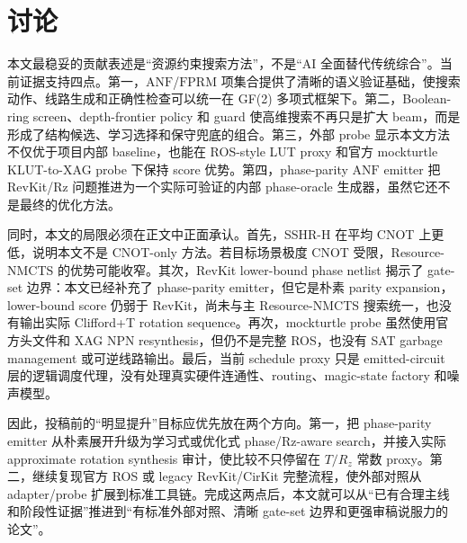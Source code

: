\documentclass[UTF8,fontset=macnew,11pt]{ctexart}
\newcommand{\method}{Resource-NMCTS}
\newcommand{\anf}{\ensuremath{\mathrm{ANF}}}
\newcommand{\fprm}{\ensuremath{\mathrm{FPRM}}}
\begin{document}
\section{讨论}

本文最稳妥的贡献表述是“资源约束搜索方法”，不是“AI 全面替代传统综合”。当前证据支持四点。第一，\anf{}/\fprm{} 项集合提供了清晰的语义验证基础，使搜索动作、线路生成和正确性检查可以统一在 GF(2) 多项式框架下。第二，Boolean-ring screen、depth-frontier policy 和 guard 使高维搜索不再只是扩大 beam，而是形成了结构候选、学习选择和保守兜底的组合。第三，外部 probe 显示本文方法不仅优于项目内部 baseline，也能在 ROS-style LUT proxy 和官方 mockturtle KLUT-to-XAG probe 下保持 score 优势。第四，phase-parity \anf{} emitter 把 RevKit/Rz 问题推进为一个实际可验证的内部 phase-oracle 生成器，虽然它还不是最终的优化方法。

同时，本文的局限必须在正文中正面承认。首先，SSHR-H 在平均 CNOT 上更低，说明本文不是 CNOT-only 方法。若目标场景极度 CNOT 受限，\method{} 的优势可能收窄。其次，RevKit lower-bound phase netlist 揭示了 gate-set 边界：本文已经补充了 phase-parity emitter，但它是朴素 parity expansion，lower-bound score 仍弱于 RevKit，尚未与主 \method{} 搜索统一，也没有输出实际 Clifford+T rotation sequence。再次，mockturtle probe 虽然使用官方头文件和 XAG NPN resynthesis，但仍不是完整 ROS，也没有 SAT garbage management 或可逆线路输出。最后，当前 schedule proxy 只是 emitted-circuit 层的逻辑调度代理，没有处理真实硬件连通性、routing、magic-state factory 和噪声模型。

因此，投稿前的“明显提升”目标应优先放在两个方向。第一，把 phase-parity emitter 从朴素展开升级为学习式或优化式 phase/Rz-aware search，并接入实际 approximate rotation synthesis 审计，使比较不只停留在 $T/R_z$ 常数 proxy。第二，继续复现官方 ROS 或 legacy RevKit/CirKit 完整流程，使外部对照从 adapter/probe 扩展到标准工具链。完成这两点后，本文就可以从“已有合理主线和阶段性证据”推进到“有标准外部对照、清晰 gate-set 边界和更强审稿说服力的论文”。
\end{document}
